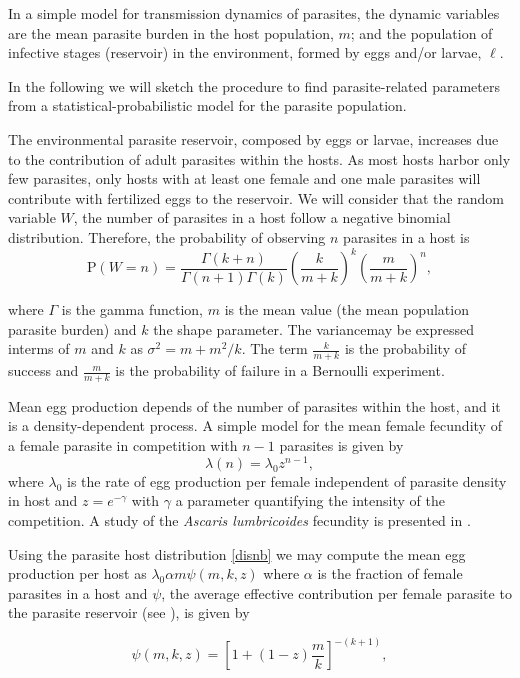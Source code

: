 \documentclass[eng]{MMSB-class-eng}
\begin{document}
In a simple model for transmission dynamics of parasites, 
the dynamic variables  are the mean parasite burden in the host population, $m$; and the population of infective stages (reservoir) in the environment, formed by eggs and/or larvae, $\ell$. 

In the following we will sketch the procedure to find parasite-related parameters from a statistical-probabilistic model for the parasite population.

The environmental parasite reservoir, composed by eggs or larvae, increases due to the contribution of adult parasites within the hosts. As most hosts harbor only few parasites, only hosts with at least one female and one male parasites will contribute with fertilized eggs to the reservoir. We will consider that the random variable $W$, the number of parasites in a host follow a negative binomial distribution. 
Therefore, the probability of observing $n$ parasites in a host is
\begin{equation}\label{disnb}
\mathrm{P}(W=n)=\frac{\Gamma(k+n)}{\Gamma(n+1)\Gamma(k)}\left( \frac{k}{m+k}\right) ^{k} \left( \frac{m}{m+k}\right) ^n,
\end{equation}
{\color{red}
where $\Gamma$ is the gamma function,  
$m$ is the mean value (the mean population parasite burden) and $k$ the shape parameter. The variancemay be expressed interms of  $m$ and  $k$ as $\sigma^2=m+m^2/k$. 
The term $\frac{k}{m+k}$ is the probability of success and $ \frac{m}{m+k}$ is the  probability of failure in 
a Bernoulli experiment. %



Mean egg production depends of the number of parasites within the host, and it is a density-dependent process. 
A simple model for the mean female fecundity of a female parasite in competition with $n-1$ parasites is given by 
\begin{equation}
\lambda(n)=\lambda_0 z^{n-1},
\end{equation}
where $\lambda_0$ is the rate of egg production per female independent of parasite density in host and $z=e^{-\gamma}$ with $\gamma$ a parameter quantifying the intensity of the competition. A study of the \textit{Ascaris lumbricoides} fecundity is presented in \citet{hall2000geographical}. 


Using the parasite host distribution \eqref{disnb} we may compute the mean egg production per host as \citep{lopez2022general}
$\lambda_0
\alpha m
\psi(m,k,z)$
where $\alpha$  is the fraction of female parasites in a host and $\psi$, the average effective contribution per female parasite to the parasite reservoir (see \citet{churcher2006density,lopez2022general}), is given by}
\begin{equation}\label{psi}
\psi(m,k,z)=\left[ 1+(1-z)\dfrac{m}{k}\right]^{-(k+1)},
\end{equation}
\end{document}
